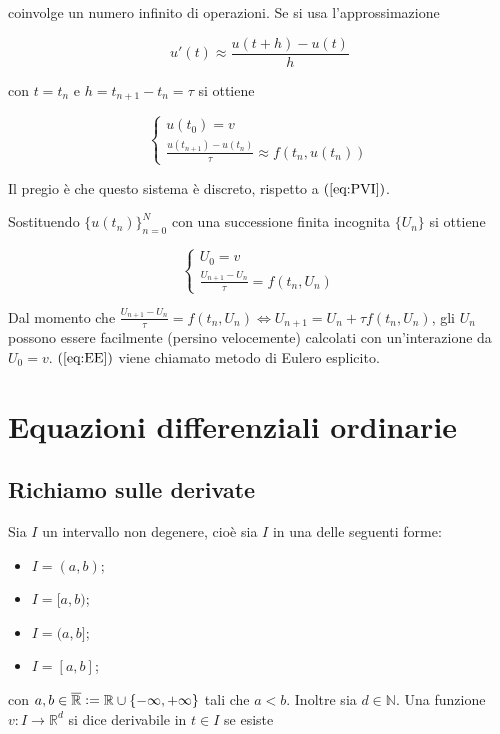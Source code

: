 \documentclass[hidelinks, 10pt]{report}
\begin{document}
coinvolge un numero infinito di operazioni. Se si usa l'approssimazione

\[ u'(t) \approx \frac{u(t + h) - u(t)}{h} \]

con $ t = t_{n} $ e $ h = t_{n + 1} - t_{n} = \tau $ si ottiene

\[
\begin{cases}
u(t_{0}) = v \\
\frac{u(t_{n + 1}) - u(t_{n})}{\tau} \approx f \left( t_{n}, u(t_{n}) \right)
\end{cases}
\]

Il pregio \`e che questo sistema \`e discreto, rispetto a $ (\ref{eq:PVI}) $.

Sostituendo $ \{ u(t_{n}) \}_{n = 0}^{N} $ con una successione finita incognita $ \{ U_{n} \} $ si ottiene

\begin{equation}	\label{eq:EE}
\begin{cases}
U_{0} = v \\
\frac{U_{n + 1} - U_{n}}{\tau} = f(t_{n}, U_{n})
\end{cases}
\end{equation}

Dal momento che $ \frac{U_{n + 1} - U_{n}}{\tau} = f(t_{n}, U_{n}) \iff U_{n + 1} = U_{n} + \tau f(t_{n}, U_{n}) $, gli $ U_{n} $ possono essere facilmente (persino velocemente) calcolati con un'interazione da $ U_{0} = v $. $ (\ref{eq:EE}) $ viene chiamato metodo di Eulero esplicito.

\section{Equazioni differenziali ordinarie}
\subsection{Richiamo sulle derivate}
Sia $ I $ un intervallo non degenere, cio\`e sia $ I $ in una delle seguenti forme:
\begin{itemize}
\item $ I = (a, b) $;
\item $ I = [a, b) $;
\item $ I = (a, b] $;
\item $ I = [a, b] $; 
\end{itemize}

con $ a, b \in \overline{\mathbb{R}} \vcentcolon= \mathbb{R} \cup \{ - \infty, + \infty \} $ tali che $ a < b $. Inoltre sia $ d \in \mathbb{N} $. Una funzione $ v: I \to \mathbb{R}^{d} $ si dice derivabile in $ t \in I $ se esiste
\end{document}
